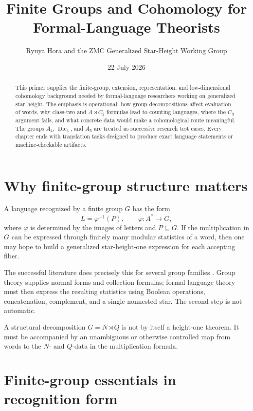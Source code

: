 \documentclass{amsart}
\title{Finite Groups and Cohomology for Formal-Language Theorists}
\author{Ryuya Hora and the ZMC Generalized Star-Height Working Group}
\date{22 July 2026}
\begin{document}
\begin{abstract}
This primer supplies the finite-group, extension, representation, and low-dimensional cohomology background needed by formal-language researchers working on generalized star height.  The emphasis is operational: how group decompositions affect evaluation of words, why class-two and $A\rtimes C_2$ formulas lead to counting languages, where the $C_3$ argument fails, and what concrete data would make a cohomological route meaningful.  The groups $A_4$, $\operatorname{Dic}_3$, and $A_5$ are treated as successive research test cases.  Every chapter ends with translation tasks designed to produce exact language statements or machine-checkable artifacts.
\end{abstract}
\maketitle
\tableofcontents

\section{Why finite-group structure matters}

A language recognized by a finite group $G$ has the form
\[
  L=\varphi^{-1}(P),\qquad \varphi:A^\ast\to G,
\]
where $\varphi$ is determined by the images of letters and $P\subseteq G$.  If the multiplication in $G$ can be expressed through finitely many modular statistics of a word, then one may hope to build a generalized star-height-one expression for each accepting fiber.

The successful literature does precisely this for several group families \cite{pinStraubingTherien1992}.  Group theory supplies normal forms and collection formulas; formal-language theory must then express the resulting statistics using Boolean operations, concatenation, complement, and a single nonnested star.  The second step is not automatic.

\begin{warning}
A structural decomposition $G=N\rtimes Q$ is not by itself a height-one theorem.  It must be accompanied by an unambiguous or otherwise controlled map from words to the $N$- and $Q$-data in the multiplication formula.
\end{warning}

\section{Finite-group essentials in recognition form}
\end{document}
